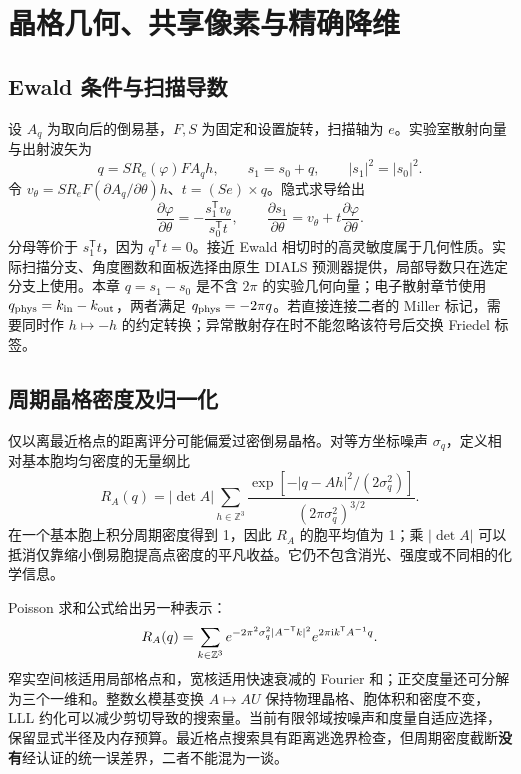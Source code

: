 \chapter{晶格几何、共享像素与精确降维}
\section{Ewald 条件与扫描导数}
设 $A_q$ 为取向后的倒易基，$F,S$ 为固定和设置旋转，扫描轴为 $e$。实验室散射向量与出射波矢为
\begin{equation}
q=SR_e(\varphi)FA_qh,\qquad s_1=s_0+q,\qquad |s_1|^2=|s_0|^2.
\end{equation}
令 $v_\theta=SR_eF(\partial A_q/\partial\theta)h$、$t=(Se)\times q$。隐式求导给出
\begin{equation}
\frac{\partial\varphi}{\partial\theta}=-\frac{s_1^{\mathsf T}v_\theta}{s_0^{\mathsf T}t},\qquad
\frac{\partial s_1}{\partial\theta}=v_\theta+t\frac{\partial\varphi}{\partial\theta}.
\end{equation}
分母等价于 $s_1^{\mathsf T}t$，因为 $q^{\mathsf T}t=0$。接近 Ewald 相切时的高灵敏度属于几何性质。实际扫描分支、角度圈数和面板选择由原生 DIALS 预测器提供，局部导数只在选定分支上使用\cite{geometry}。本章 $q=s_1-s_0$ 是不含 $2\pi$ 的实验几何向量；电子散射章节使用 $q_{\rm phys}=k_{\rm in}-k_{\rm out}$，两者满足 $q_{\rm phys}=-2\pi q$。若直接连接二者的 Miller 标记，需要同时作 $h\mapsto-h$ 的约定转换；异常散射存在时不能忽略该符号后交换 Friedel 标签。
\section{周期晶格密度及归一化}
仅以离最近格点的距离评分可能偏爱过密倒易晶格。对等方坐标噪声 $\sigma_q$，定义相对基本胞均匀密度的无量纲比
\begin{equation}
R_A(q)=|\det A|\sum_{h\in\mathbb Z^3}
\frac{\exp[-|q-Ah|^2/(2\sigma_q^2)]}{(2\pi\sigma_q^2)^{3/2}}.
\end{equation}
在一个基本胞上积分周期密度得到 1，因此 $R_A$ 的胞平均值为 1；乘 $|\det A|$ 可以抵消仅靠缩小倒易胞提高点密度的平凡收益。它仍不包含消光、强度或不同相的化学信息。

Poisson 求和公式给出另一种表示：
\begin{equation}
R_A(q)=\sum_{k\in\mathbb Z^3}
 e^{-2\pi^2\sigma_q^2|A^{-\mathsf T}k|^2}
 e^{2\pi\mathrm{i} k^{\mathsf T}A^{-1}q}.
\end{equation}
窄实空间核适用局部格点和，宽核适用快速衰减的 Fourier 和；正交度量还可分解为三个一维和。整数幺模基变换 $A\mapsto AU$ 保持物理晶格、胞体积和密度不变，LLL 约化可以减少剪切导致的搜索量。当前有限邻域按噪声和度量自适应选择，保留显式半径及内存预算。最近格点搜索具有距离逃逸界检查，但周期密度截断\textbf{没有}经认证的统一误差界，二者不能混为一谈。

